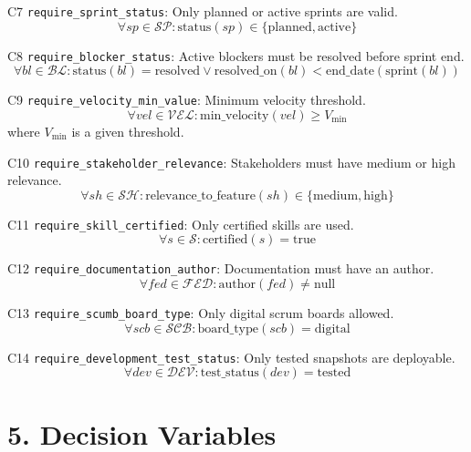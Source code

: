 \documentclass[12pt]{article}
\begin{document}
    \item[C7] \texttt{require\_sprint\_status}: Only planned or active sprints are valid.
    \[
    \forall sp \in \mathcal{SP}: \text{status}(sp) \in \{\text{planned}, \text{active}\}
    \]

    \item[C8] \texttt{require\_blocker\_status}: Active blockers must be resolved before sprint end.
    \[
    \forall bl \in \mathcal{BL}: \text{status}(bl) = \text{resolved} \vee \text{resolved\_on}(bl) < \text{end\_date}(\text{sprint}(bl))
    \]

    \item[C9] \texttt{require\_velocity\_min\_value}: Minimum velocity threshold.
    \[
    \forall vel \in \mathcal{VEL}: \text{min\_velocity}(vel) \geq V_{\min}
    \]
    where $V_{\min}$ is a given threshold.

    \item[C10] \texttt{require\_stakeholder\_relevance}: Stakeholders must have medium or high relevance.
    \[
    \forall sh \in \mathcal{SH}: \text{relevance\_to\_feature}(sh) \in \{\text{medium}, \text{high}\}
    \]

    \item[C11] \texttt{require\_skill\_certified}: Only certified skills are used.
    \[
    \forall s \in \mathcal{S}: \text{certified}(s) = \text{true}
    \]

    \item[C12] \texttt{require\_documentation\_author}: Documentation must have an author.
    \[
    \forall fed \in \mathcal{FED}: \text{author}(fed) \neq \text{null}
    \]

    \item[C13] \texttt{require\_scumb\_board\_type}: Only digital scrum boards allowed.
    \[
    \forall scb \in \mathcal{SCB}: \text{board\_type}(scb) = \text{digital}
    \]

    \item[C14] \texttt{require\_development\_test\_status}: Only tested snapshots are deployable.
    \[
    \forall dev \in \mathcal{DEV}: \text{test\_status}(dev) = \text{tested}
    \]

\section{5. Decision Variables}
\end{document}
